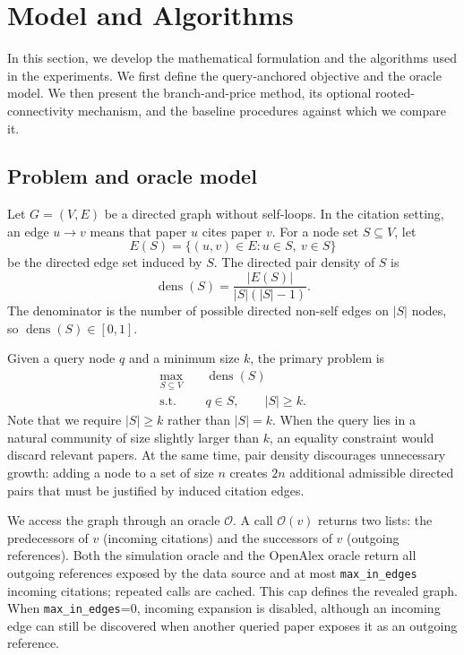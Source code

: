 \documentclass[12pt]{article}
\newcommand{\dens}{\operatorname{dens}}
\newcommand{\Oracle}{\mathcal{O}}
\begin{document}
\section{Model and Algorithms}
\label{sec:model-algorithms}

In this section, we develop the mathematical formulation and the algorithms used in the experiments.  We first define the query-anchored objective and the oracle model.  We then present the branch-and-price method, its optional rooted-connectivity mechanism, and the baseline procedures against which we compare it.

\subsection{Problem and oracle model}
\label{subsec:problem-oracle}

Let $G=(V,E)$ be a directed graph without self-loops.  In the citation setting, an edge $u\to v$ means that paper $u$ cites paper $v$.  For a node set $S\subseteq V$, let
\[
  E(S)=\{(u,v)\in E: u\in S,\ v\in S
  \}
\]
be the directed edge set induced by $S$.  The directed pair density of $S$ is
\begin{equation}
  \label{eq:pair-density}
  \dens(S)=\frac{|E(S)|}{|S|(|S|-1)}.
\end{equation}
The denominator is the number of possible directed non-self edges on $|S|$ nodes, so $\dens(S)\in[0,1]$.

Given a query node $q$ and a minimum size $k$, the primary problem is
\begin{equation}
  \label{eq:main-problem}
  \begin{aligned}
    \max_{S\subseteq V}\quad & \dens(S)                 \\
    \text{s.t.}\quad         & q\in S,\qquad |S|\ge k .
  \end{aligned}
\end{equation}
Note that we require $|S|\ge k$ rather than $|S|=k$.  When the query lies in a natural community of size slightly larger than $k$, an equality constraint would discard relevant papers.  At the same time, pair density discourages unnecessary growth: adding a node to a set of size $n$ creates $2n$ additional admissible directed pairs that must be justified by induced citation edges.

We access the graph through an oracle $\Oracle$.  A call $\Oracle(v)$ returns two lists: the predecessors of $v$ (incoming citations) and the successors of $v$ (outgoing references).  Both the simulation oracle and the OpenAlex oracle return all outgoing references exposed by the data source and at most \texttt{max\_in\_edges} incoming citations; repeated calls are cached.  This cap defines the revealed graph.  When \texttt{max\_in\_edges}=0, incoming expansion is disabled, although an incoming edge can still be discovered when another queried paper exposes it as an outgoing reference.
\end{document}

